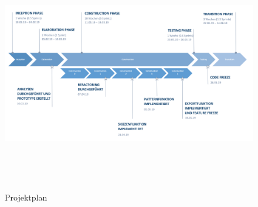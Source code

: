 \begin{landscape}
	\label{subsec:timeline}
		\begin{figure}[h]
			\centering
			\includegraphics[width=1\linewidth, height=10.5cm]{img/projekt-plan/projekt-plan}
			\caption[Projektplan]{Projektplan}
			\label{fig:projekt-plan}
		\end{figure}
	\vspace{0.5cm}
	
	
	
	
	
	\label{pdf:projekt-risiken}
\end{landscape}
